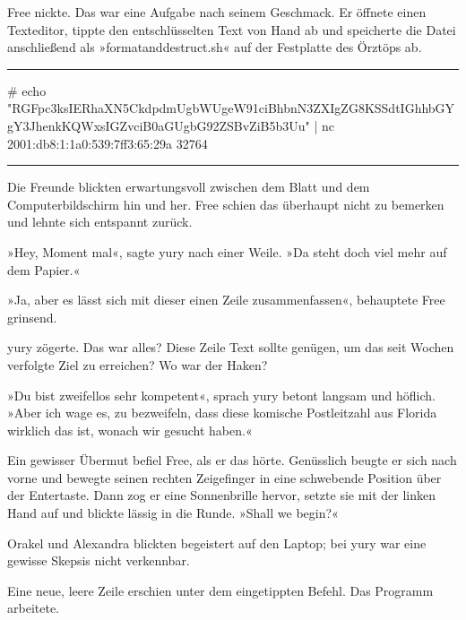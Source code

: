 Free nickte. Das war eine Aufgabe nach seinem Geschmack. Er öffnete einen Texteditor, tippte den entschlüsselten Text von Hand ab und speicherte die Datei anschließend als »formatanddestruct.sh« auf der Festplatte des Örztöps ab.

\noindent \parbox{\textwidth}{ \vspace{3ex} \hrule \vspace{3ex}

    \begin{tiny}
    \begin{ttfamily}

\noindent \# echo "RGFpc3ksIERhaXN5CkdpdmUgbWUgeW91ciBhbnN3ZXIgZG8KSSdtIGhhbGYgY3JhenkKQWxsIGZvciB0aGUgbG92ZSBvZiB5b3Uu" | nc 2001:db8:1:1a0:539:7ff3:65:29a 32764

    \end{ttfamily}
    \end{tiny}

\vspace{3ex} \hrule \vspace{3ex} }

Die Freunde blickten erwartungsvoll zwischen dem Blatt und dem Computerbildschirm hin und her. Free schien das überhaupt nicht zu bemerken und lehnte sich entspannt zurück.

»Hey, Moment mal«, sagte yury nach einer Weile. »Da steht doch viel mehr auf dem Papier.«

»Ja, aber es lässt sich mit dieser einen Zeile zusammenfassen«, behauptete Free grinsend.

yury zögerte. Das war alles? Diese Zeile Text sollte genügen, um das seit Wochen verfolgte Ziel zu erreichen? Wo war der Haken?

»Du bist zweifellos sehr kompetent«, sprach yury betont langsam und höflich. »Aber ich wage es, zu bezweifeln, dass diese komische Postleitzahl aus Florida wirklich das ist, wonach wir gesucht haben.«

Ein gewisser Übermut befiel Free, als er das hörte. Genüsslich beugte er sich nach vorne und bewegte seinen rechten Zeigefinger in eine schwebende Position über der Entertaste. Dann zog er eine Sonnenbrille hervor, setzte sie mit der linken Hand auf und blickte lässig in die Runde. »Shall we begin?«

Orakel und Alexandra blickten begeistert auf den Laptop; bei yury war eine gewisse Skepsis nicht verkennbar.


Eine neue, leere Zeile erschien unter dem eingetippten Befehl. Das Programm arbeitete.


